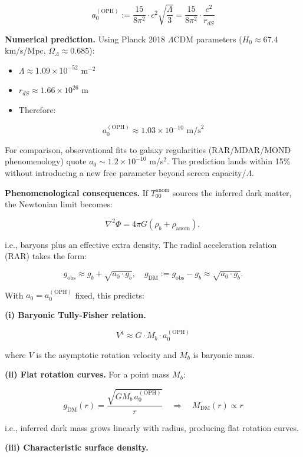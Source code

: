 \documentclass[11pt,a4paper]{article}
\theoremstyle{remark}
\providecommand{\tightlist}{%
  \setlength{\itemsep}{0pt}\setlength{\parskip}{0pt}}
\begin{document}
\[
\boxed{
a_0^{\mathrm{(OPH)}} := \frac{15}{8\pi^2} \cdot c^2 \sqrt{\frac{\Lambda}{3}}
= \frac{15}{8\pi^2} \cdot \frac{c^2}{r_{dS}}
}
\]

\textbf{Numerical prediction.} Using Planck 2018 \(\Lambda\)CDM parameters
(\(H_0 \approx 67.4\) km/s/Mpc, \(\Omega_\Lambda \approx 0.685\)):

\begin{itemize}
\tightlist
\item
  \(\Lambda \approx 1.09 \times 10^{-52}\) m\(^{-2}\)
\item
  \(r_{dS} \approx 1.66 \times 10^{26}\) m
\item
  Therefore:
\end{itemize}

\[
\boxed{
a_0^{\mathrm{(OPH)}} \approx 1.03 \times 10^{-10} \text{ m/s}^2
}
\]

For comparison, observational fits to galaxy regularities (RAR/MDAR/MOND
phenomenology) quote \(a_0 \sim 1.2 \times 10^{-10}\) m/s\(^2\). The prediction
lands within 15\% without introducing a new free parameter beyond screen
capacity/\(\Lambda\).

\textbf{Phenomenological consequences.} If \(T_{00}^{\mathrm{anom}}\) sources the
inferred dark matter, the Newtonian limit becomes:

\[
\nabla^2 \Phi = 4\pi G (\rho_b + \rho_{\mathrm{anom}}),
\]

i.e., baryons plus an effective extra density. The radial acceleration
relation (RAR) takes the form:

\[
g_{\mathrm{obs}} \approx g_b + \sqrt{a_0 \cdot g_b},
\quad
g_{\mathrm{DM}} := g_{\mathrm{obs}} - g_b \approx \sqrt{a_0 \cdot g_b}.
\]

With \(a_0 = a_0^{\mathrm{(OPH)}}\) fixed, this predicts:

\textbf{(i) Baryonic Tully-Fisher relation.}

\[
V^4 \approx G \cdot M_b \cdot a_0^{\mathrm{(OPH)}}
\]

where \(V\) is the asymptotic rotation velocity and \(M_b\) is baryonic mass.

\textbf{(ii) Flat rotation curves.} For a point mass \(M_b\):

\[
g_{\mathrm{DM}}(r) = \frac{\sqrt{G M_b \, a_0^{\mathrm{(OPH)}}}}{r}
\quad \Rightarrow \quad
M_{\mathrm{DM}}(r) \propto r
\]

i.e., inferred dark mass grows linearly with radius, producing flat rotation
curves.

\textbf{(iii) Characteristic surface density.}
\end{document}

